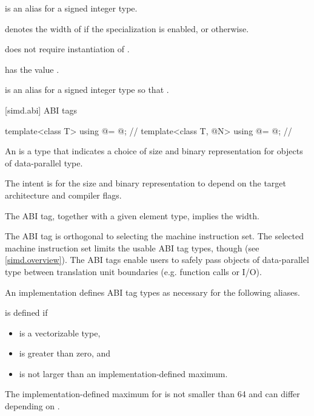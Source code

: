 \pnum
\simdsizetype{} is an alias for a signed integer type.

\pnum
{} denotes the width of  if
the specialization  is enabled, or  otherwise.
\begin{note}
   does not require instantiation of .
\end{note}

\pnum
{} has the value .

\pnum
{} is an alias for a signed integer type  so that .

[simd.abi]{ ABI tags}

\begin{codeblock}
template<class T> using @\nativeabi@ = @\seebelow@; // \expos
template<class T, @\simdsizetype@ N> using @\deducet@ = @\seebelow@; // \expos
\end{codeblock}

\pnum\label{wording.ABI.tag}
An  is a type that indicates a choice of size and binary
representation for objects of data-parallel type.
\begin{note}
  The intent is for the size and binary representation to depend on the target
  architecture and compiler flags.
\end{note}
The ABI tag, together with a given element type, implies the width.

\pnum
\begin{note}
The ABI tag is orthogonal to selecting the machine instruction set.
The selected machine instruction set limits the usable ABI tag types, though
(see \ref{simd.overview}).
The ABI tags enable users to safely pass objects of data-parallel type between
translation unit boundaries (e.g. function calls or I/O).
\end{note}

\pnum
An implementation defines ABI tag types as necessary for the following aliases.

\pnum\label{wording.deducet}
 is defined if
\begin{itemize}
  \item {} is a vectorizable type,
  \item {} is greater than zero, and
  \item {} is not larger than an implementation-defined maximum.
\end{itemize}
The implementation-defined maximum for  is not smaller than 64
and can differ depending on .


